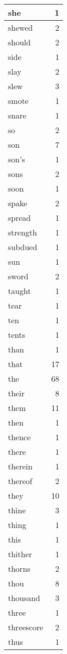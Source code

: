 \begin{center}
\begin{longtable}{l|r}
she & 1\\ \hline 
shewed & 2\\ \hline 
should & 2\\ \hline 
side & 1\\ \hline 
slay & 2\\ \hline 
slew & 3\\ \hline 
smote & 1\\ \hline 
snare & 1\\ \hline 
so & 2\\ \hline 
son & 7\\ \hline 
son's & 1\\ \hline 
sons & 2\\ \hline 
soon & 1\\ \hline 
spake & 2\\ \hline 
spread & 1\\ \hline 
strength & 1\\ \hline 
subdued & 1\\ \hline 
sun & 1\\ \hline 
sword & 2\\ \hline 
taught & 1\\ \hline 
tear & 1\\ \hline 
ten & 1\\ \hline 
tents & 1\\ \hline 
than & 1\\ \hline 
that & 17\\ \hline 
the & 68\\ \hline 
their & 8\\ \hline 
them & 11\\ \hline 
then & 1\\ \hline 
thence & 1\\ \hline 
there & 1\\ \hline 
therein & 1\\ \hline 
thereof & 2\\ \hline 
they & 10\\ \hline 
thine & 3\\ \hline 
thing & 1\\ \hline 
this & 1\\ \hline 
thither & 1\\ \hline 
thorns & 2\\ \hline 
thou & 8\\ \hline 
thousand & 3\\ \hline 
three & 1\\ \hline 
threescore & 2\\ \hline 
thus & 1\\ \hline 

\end{longtable}
\end{center}
